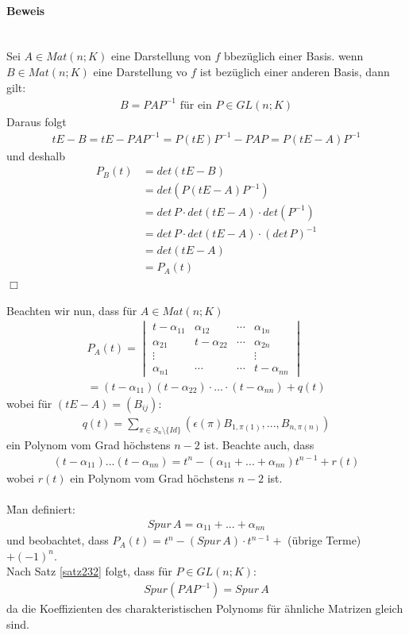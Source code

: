 \paragraph{Beweis} {\ \\}
Sei $A \in Mat(n;K)$ eine Darstellung von $f$ bbezüglich einer Basis. wenn $B \in Mat(n;K)$ eine Darstellung vo $f$ ist bezüglich einer anderen Basis, dann gilt:
\begin{align}
B = PAP^{-1} \text{ für ein } P \in GL(n;K)
\end{align}
Daraus folgt
\begin{align}
t E - B = t E - PAP^{-1} = P(tE)P^{-1} - PAP = P(t E - A)P^{-1}
\end{align}
und deshalb
\begin{align}
P_B(t) &= det(t E - B) \\
&= det(P(t E - A) P^{-1}) \\
&= det\, P \cdot det(t E - A) \cdot det(P^{-1}) \\
&= det\, P \cdot det(tE- A)\cdot (det\,P)^{-1} \\
&= det(t E - A) \\
&= P_A(t)
\end{align}
\hfill $\Box$

Beachten wir nun, dass für $A \in Mat(n;K)$
\begin{align}
P_A(t) = 
\begin{vmatrix} 
t - \alpha_{11} & \alpha_{12} & \cdots & \alpha_{1n} \\
\alpha_{21} & t- \alpha_{22} & \cdots & \alpha_{2n} \\
\vdots & & & \vdots \\
\alpha_{n1} & \cdots & \cdots & t - \alpha_{nn}
\end{vmatrix} \\
= (t - \alpha_{11})(t-\alpha_{22}) \cdot ... \cdot (t-\alpha_{nn})+ q(t)
\end{align}
wobei für $(t E - A) = (B_{ij})$:
\begin{align}
q(t) = \sum_{\pi \in S_n \setminus \{Id\}} (\epsilon(\pi) B_{1, \pi(1)}, ..., B_{n, \pi(n)})
\end{align}
ein Polynom vom Grad höchstens $n-2$ ist.
Beachte auch, dass
\begin{align}
(t-\alpha_{11})...(t-\alpha_{nn}) = t^n - (\alpha_{11}+...+\alpha_{nn})t^{n-1} + r(t)
\end{align}
wobei $r(t)$ ein Polynom vom Grad höchstens $n-2$ ist. \\\\
\f{Man definiert:}
\begin{align}
Spur\, A = \alpha_{11} + ... + \alpha_{nn}
\end{align}
und beobachtet, dass $P_A(t) = t^n - (Spur\, A)\cdot t^{n-1} +$ (übrige Terme) $+ (-1)^n$.\\
Nach Satz \ref{satz232} folgt, dass für $P \in GL(n;K)$:
\begin{align}
Spur(PAP^{-1}) = Spur\, A
\end{align}
da die Koeffizienten des charakteristischen Polynoms für ähnliche Matrizen gleich sind.

